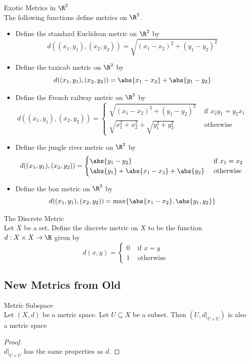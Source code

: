 \documentclass[a4paper]{article}
\begin{document}
\begin{eg}{Exotic Metrics in $\R^2$}{}\\
The following functions define metrics on $\R^2$. 
\begin{itemize}
\item Define the standard Euclidean metric on $\R^2$ by $$d((x_1,y_1),(x_2,y_2))=\sqrt{(x_1-x_2)^2+(y_1-y_2)^2}$$
\item Define the taxicab metric on $\R^2$ by $$d((x_1,y_1),(x_2,y_2))=\abs{x_1-x_2}+\abs{y_1-y_2}$$
\item Define the French railway metric on $\R^2$ by $$d((x_1,y_1),(x_2,y_2))=\begin{cases}
\sqrt{(x_1-x_2)^2+(y_1-y_2)^2} & \text{ if } x_2y_1=y_2x_1\\
\sqrt{x_1^2+x_2^2}+\sqrt{y_1^2+y_2^2} & \text{ otherwise }
\end{cases}$$
\item Define the jungle river metric on $\R^2$ by $$d((x_1,y_1),(x_2,y_2))=\begin{cases}
\abs{y_1-y_2} & \text{ if } x_1=x_2\\
\abs{y_1}+\abs{x_1-x_2}+\abs{y_2} & \text{ otherwise }
\end{cases}$$
\item Define the box metric on $\R^2$ by $$d((x_1,y_1),(x_2,y_2))=\max\{\abs{x_1-x_2},\abs{y_1,y_2}\}$$
\end{itemize}
\end{eg}

\begin{eg}{The Discrete Metric}{}\\
Let $X$ be a set. Define the discrete metric on $X$ to be the function $d:X\times X\to\R$ given by $$d(x,y)=\begin{cases}
0 & \text{ if }x=y\\
1 & \text{ otherwise }
\end{cases}$$
\end{eg}

\subsection{New Metrics from Old}
\begin{lmm}{Metric Subspace}{}\\
Let $(X,d)$ be a metric space. Let $U\subseteq X$ be a subset. Then $(U,d|_{U\times U})$ is also a metric space
\begin{proof}\\
$d|_{U\times U}$ has the same properties as $d$. 
\end{proof}
\end{lmm}
\end{document}
